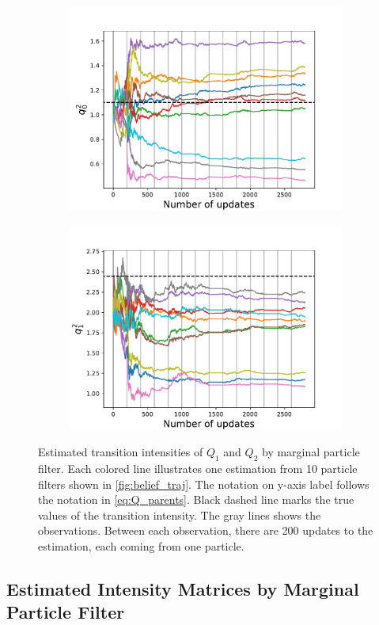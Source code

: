 \begin{figure}[H]
\begin{subfigure}{.5\textwidth}
		\includegraphics[width=1\linewidth]{figures/q_convergence/Q2_01}
		\caption{}
		\label{fig:Q2_01}
	\end{subfigure}
	\begin{subfigure}{.5\textwidth}
		\centering
		\includegraphics[width=1\linewidth]{figures/q_convergence/Q2_10}
		\caption{}
		\label{fig:Q2_10}
	\end{subfigure}
	\caption[Estimation of $ Q_1 $ and $ Q_2 $ by marginal particle filter]{Estimated transition intensities of $ Q_1 $ and $ Q_2 $ by marginal particle filter. Each colored line illustrates one estimation from 10 particle filters shown in \autoref{fig:belief_traj}. The notation on y-axis label follows the notation in \autoref{eq:Q_parents}. Black dashed line marks the true values of the transition intensity. The gray lines shows the observations. Between each observation, there are 200 updates to the estimation, each coming from one particle.}
	\label{fig:q_convergence}
\end{figure}
\subsection{Estimated Intensity Matrices by Marginal Particle Filter}

